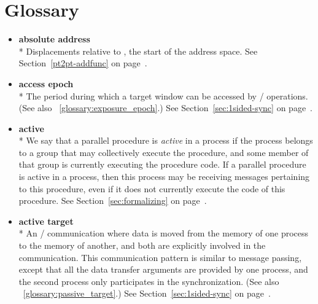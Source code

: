 %
%
%
%
%
%

\chapter{Glossary}
\label{glossary}
\begin{itemize}

\label{glossary:absolute_address}
\item \textbf{ absolute address} \\*
Displacements relative to  , 
the start of the address space.
See Section~\ref{pt2pt-addfunc} on page~\pageref{pt2pt-addfunc}.

\label{glossary:access_epoch}
\item \textbf{ access epoch} \\*
The period during which a target window can be accessed by \RMA/
operations.
(See also ~\ref{glossary:exposure_epoch}.)
See Section~\ref{sec:1sided-sync} on page~\pageref{sec:1sided-sync}.

\label{glossary:active}
\item \textbf{ active} \\* 
We say that a parallel procedure is {\em active} in a process if the process
belongs to a group that may collectively execute the procedure, and
some member of that group is currently executing the procedure code.
If a parallel procedure is active in a process, then this process may
be receiving messages pertaining to this procedure, even if it
does not currently execute the code of this procedure.
See Section~\ref{sec:formalizing} on page~\pageref{sec:formalizing}.

\label{glossary:active_target}
\item \textbf{ active target} \\*
An \RMA/ communication where data is moved from the memory of one
process to the memory of another, and both are explicitly involved in the
communication.  This communication pattern is similar to message
passing, except that all the data transfer arguments are provided by
one process, and the second process only participates in the synchronization.
(See also ~\ref{glossary:passive_target}.)
See Section~\ref{sec:1sided-sync} on page~\pageref{sec:1sided-sync}.


\end{itemize}
